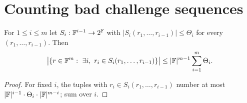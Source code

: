 \section{Counting bad challenge sequences}

\begin{lemma}\label{lem:bad-count}
For $1\le i\le m$ let $S_i:\mathbb{F}^{i-1}\to2^{\mathbb{F}}$ with $|S_i(r_1,\dots,r_{i-1})|\le\Theta_i$ for
every $(r_1,\dots,r_{i-1})$. Then
\[
\big|\{r\in\mathbb{F}^m:\ \exists i,\ r_i\in S_i(r_1,\dots,r_{i-1})\}\big|
\le|\mathbb{F}|^{m-1}\sum_{i=1}^m\Theta_i .
\]
\end{lemma}

\begin{proof}
For fixed $i$, the tuples with $r_i\in S_i(r_1,\dots,r_{i-1})$ number at most
$|\mathbb{F}|^{i-1}\cdot\Theta_i\cdot|\mathbb{F}|^{m-i}$; sum over $i$.
\end{proof}
